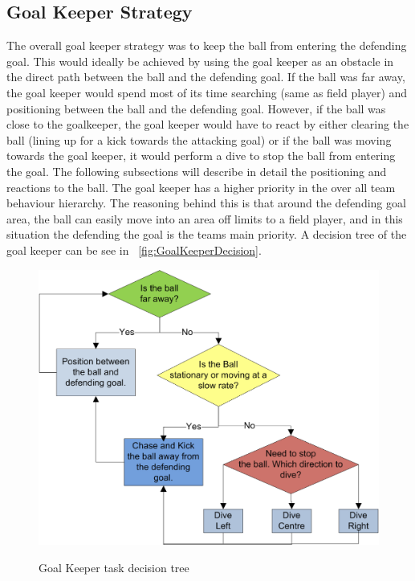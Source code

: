 \subsection{Goal Keeper Strategy}
The overall goal keeper strategy was to keep the ball from entering the defending goal. This would ideally be achieved by using the goal keeper as an obstacle in the direct path between the ball and the defending goal. If the ball was far away, the goal keeper would spend most of its time searching (same as field player) and positioning between the ball and the defending goal. However, if the ball was close to the goalkeeper, the goal keeper would have to react by either clearing the ball (lining up for a kick towards the attacking goal) or if the ball was moving towards the goal keeper, it would perform a dive to stop the ball from entering the goal. The following subsections will describe in detail the positioning and reactions to the ball. The goal keeper has a higher priority in the over all team behaviour hierarchy. The reasoning behind this is that around the defending goal area, the ball can easily move into an area off limits to a field player, and in this situation the defending the goal is the teams main priority. A decision tree of the goal keeper can be see in ~\autoref{fig:GoalKeeperDecision}.

\begin{figure}[htpb]
\begin{center}
   \leavevmode
    \scalebox{0.8} {\includegraphics{aaronfigs/GoalKeeperDecisions.png} }
    \caption{Goal Keeper task decision tree}
    \label{fig:GoalKeeperDecision}
\end{center}
\end{figure}

